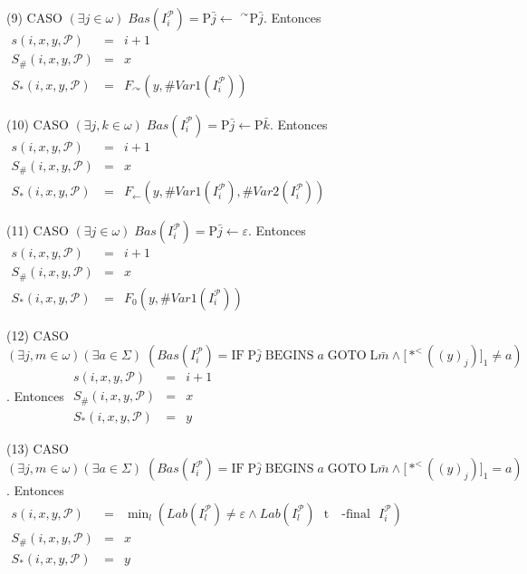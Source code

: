(9) CASO \((\exists j\in \omega )\;Bas(I_{i}^{\mathcal{P}})=\mathrm{P} \bar{j}\leftarrow \) \(^{\curvearrowright }\mathrm{P}\bar{j}\). Entonces
\(\displaystyle \begin{array}{rcl} s(i,x,y,\mathcal{P}) & =& i+1 \\ S_{\#}(i,x,y,\mathcal{P}) & =& x \\ S_{\ast }(i,x,y,\mathcal{P}) & =& F_{\curvearrowright }(y,\#Var1(I_{i}^{ \mathcal{P}})) \end{array} \)

(10) CASO \((\exists j,k\in \omega )\;Bas(I_{i}^{\mathcal{P}})=\mathrm{ P}\bar{j}\leftarrow \mathrm{P}\bar{k}\). Entonces
\(\displaystyle \begin{array}{rcl} s(i,x,y,\mathcal{P}) & =& i+1 \\ S_{\#}(i,x,y,\mathcal{P}) & =& x \\ S_{\ast }(i,x,y,\mathcal{P}) & =& F_{\leftarrow }(y,\#Var1(I_{i}^{\mathcal{P} }),\#Var2(I_{i}^{\mathcal{P}})) \end{array} \)

(11) CASO \((\exists j\in \omega )\;Bas(I_{i}^{\mathcal{P}})=\mathrm{P} \bar{j}\leftarrow \varepsilon \). Entonces
\(\displaystyle \begin{array}{rcl} s(i,x,y,\mathcal{P}) & =& i+1 \\ S_{\#}(i,x,y,\mathcal{P}) & =& x \\ S_{\ast }(i,x,y,\mathcal{P}) & =& F_{0}(y,\#Var1(I_{i}^{\mathcal{P}})) \end{array} \)

(12) CASO \((\exists j,m\in \omega )(\exists a\in \Sigma )\;\left( Bas(I_{i}^{\mathcal{P}})=\mathrm{IF}\;\mathrm{P}\bar{j}\;\mathrm{BEGINS}\;a\; \mathrm{GOTO}\;\mathrm{L}\bar{m}\wedge \lbrack \ast ^{< }((y)_{j})]_{1}\neq a\right) \). Entonces
\(\displaystyle \begin{array}{rcl} s(i,x,y,\mathcal{P}) & =& i+1 \\ S_{\#}(i,x,y,\mathcal{P}) & =& x \\ S_{\ast }(i,x,y,\mathcal{P}) & =& y \end{array} \)

(13) CASO \((\exists j,m\in \omega )(\exists a\in \Sigma )\;\left( Bas(I_{i}^{\mathcal{P}})=\mathrm{IF\;P}\bar{j}\;\mathrm{BEGINS\;}a\;\mathrm{ GOTO\;L}\bar{m}\wedge \lbrack \ast ^{< }((y)_{j})]_{1}=a\right) \). Entonces
\(\displaystyle \begin{array}{rcl} s(i,x,y,\mathcal{P}) & =& \min_{l}\left( Lab(I_{l}^{\mathcal{P}})\neq \varepsilon \wedge Lab(I_{l}^{\mathcal{P}})\text{ }\mathrm{t}\text{ { -final} }I_{i}^{\mathcal{P}}\right) \\ S_{\#}(i,x,y,\mathcal{P}) & =& x \\ S_{\ast }(i,x,y,\mathcal{P}) & =& y \end{array} \)

